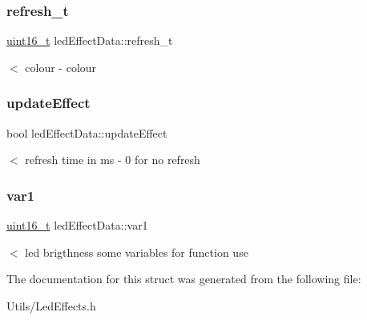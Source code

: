 \subsubsection{\texorpdfstring{refresh\+\_\+t}{refresh\_t}}
{\footnotesize\ttfamily \hyperlink{vl53l0x__types_8h_a273cf69d639a59973b6019625df33e30}{uint16\+\_\+t} led\+Effect\+Data\+::refresh\+\_\+t}

$<$ colour -\/ colour \mbox{\label{structledEffectData_a5f73d846268058bf03c0cdea345ffa1b}} 
\subsubsection{\texorpdfstring{update\+Effect}{updateEffect}}
{\footnotesize\ttfamily bool led\+Effect\+Data\+::update\+Effect}

$<$ refresh time in ms -\/ 0 for no refresh \mbox{\label{structledEffectData_a980ab6cc1f7a667f35f5f56240dfd0e3}} 
\subsubsection{\texorpdfstring{var1}{var1}}
{\footnotesize\ttfamily \hyperlink{vl53l0x__types_8h_a273cf69d639a59973b6019625df33e30}{uint16\+\_\+t} led\+Effect\+Data\+::var1}

$<$ led brigthness some variables for function use 

The documentation for this struct was generated from the following file\+:\begin{DoxyCompactItemize}
\item 
Utils/Led\+Effects.\+h\end{DoxyCompactItemize}
